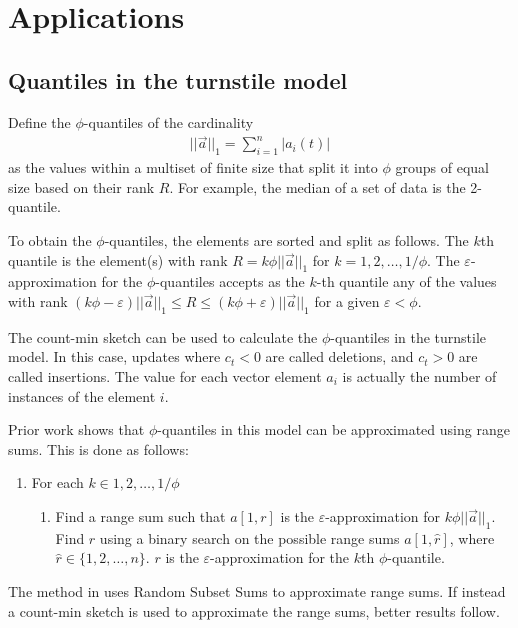 \documentclass[11pt]{article}
\begin{document}
{\section{Applications}\label{sec:applications}
\subsection{Quantiles in the turnstile model}
Define the $\phi$-quantiles of the cardinality
\begin{align}
    ||\vec{a}||_1 = \sum_{i = 1}^{n}|a_i(t)|
\end{align}
as the values within a multiset of finite size that split it into $\phi$ groups
of equal size based on their rank $R$.  For example, the median of a set of data
is the 2-quantile. 

To obtain the $\phi$-quantiles, the elements are sorted and split as follows.
The $k$th quantile is the element(s) with rank $R = k\phi||\vec{a}||_1$ for $k =
1, 2, \dots, 1/\phi$.  The $\varepsilon$-approximation for the $\phi$-quantiles
accepts as the $k$-th quantile any of the  values with rank $(k\phi -
\varepsilon)||\vec{a}||_1 \leq R \leq (k\phi + \varepsilon)||\vec{a}||_1$ for a
given $\varepsilon < \phi$.


The count-min sketch can be used to calculate the $\phi$-quantiles in the turnstile model.
In this case, updates where $c_t < 0$ are called deletions, and $c_t > 0$ are called insertions.
The value for each vector element $a_i$ is actually the number of instances of the element
$i$.

Prior work \cite{GKMS02} shows that $\phi$-quantiles in this model can be approximated using range sums. This is done
as follows:
\begin{enumerate}
    \item For each $k \in {1, 2, \dots, 1/\phi}$
    \begin{enumerate}
        \item Find a range sum such that $a[1, r]$ is the $\varepsilon$-approximation for $k\phi||\vec{a}||_1$. Find $r$ using a binary
        search on the possible range sums $a[1, \hat{r}]$, where $\hat{r} \in \{1, 2, \dots, n\}$.  $r$ is the
        $\varepsilon$-approximation for the $k$th $\phi$-quantile.
    \end{enumerate}
\end{enumerate}
The method in \cite{GKMS02} uses Random Subset Sums to approximate range sums.  If instead a count-min
sketch is used to approximate the range sums, better results follow.  

}
\end{document}
